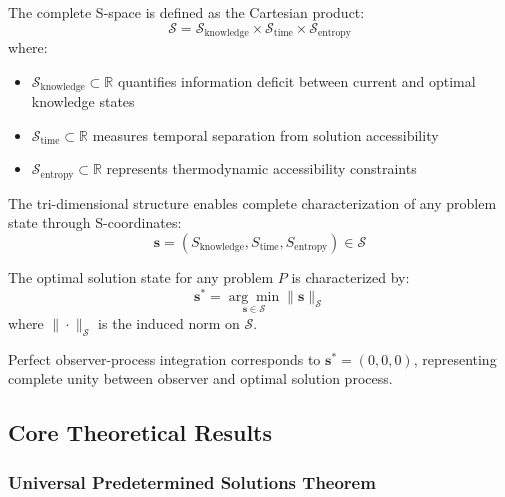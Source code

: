 \documentclass[11pt,a4paper]{article}
\begin{document}
\begin{definition}
The complete S-space is defined as the Cartesian product:
\begin{equation}
\mathcal{S} = \mathcal{S}_{\text{knowledge}} \times \mathcal{S}_{\text{time}} \times \mathcal{S}_{\text{entropy}}
\end{equation}
where:
\begin{itemize}
\item $\mathcal{S}_{\text{knowledge}} \subset \mathbb{R}$ quantifies information deficit between current and optimal knowledge states
\item $\mathcal{S}_{\text{time}} \subset \mathbb{R}$ measures temporal separation from solution accessibility  
\item $\mathcal{S}_{\text{entropy}} \subset \mathbb{R}$ represents thermodynamic accessibility constraints
\end{itemize}
\end{definition}

The tri-dimensional structure enables complete characterization of any problem state through S-coordinates:
\begin{equation}
\mathbf{s} = (S_{\text{knowledge}}, S_{\text{time}}, S_{\text{entropy}}) \in \mathcal{S}
\end{equation}

\begin{definition}
The optimal solution state for any problem $P$ is characterized by:
\begin{equation}
\mathbf{s}^* = \underset{\mathbf{s} \in \mathcal{S}}{\arg\min} \|\mathbf{s}\|_{\mathcal{S}}
\end{equation}
where $\|\cdot\|_{\mathcal{S}}$ is the induced norm on $\mathcal{S}$.
\end{definition}

Perfect observer-process integration corresponds to $\mathbf{s}^* = (0, 0, 0)$, representing complete unity between observer and optimal solution process.

\subsection{Core Theoretical Results}

\subsubsection{Universal Predetermined Solutions Theorem}
\end{document}
